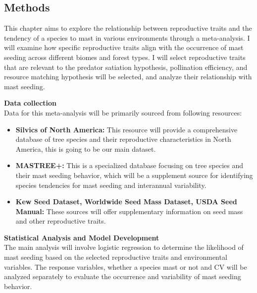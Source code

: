 \documentclass[11pt,letter]{article}
\begin{document}
\subsection{Methods}
This chapter aims to explore the relationship between reproductive traits and the tendency of a species to mast in various environments through a meta-analysis. I will examine how specific reproductive traits align with the occurrence of mast seeding across different biomes and forest types. I will select reproductive traits that are relevant to the predator satiation hypothesis, pollination efficiency, and resource matching hypothesis will be selected, and analyze their relationship with mast seeding.\par
\textbf{Data collection}\\
Data for this meta-analysis will be primarily sourced from following resources:
	\begin{itemize}
	\item \textbf{Silvics of North America:} This resource will provide a comprehensive database of tree species and their reproductive characteristics in North America, this is going to be our main dataset.
	\item \textbf{MASTREE+:} This is a specialized database focusing on tree species and their mast seeding behavior, which will be a supplement source for identifying species tendencies for mast seeding and interannual variability.
	\item \textbf{Kew Seed Dataset, Worldwide Seed Mass Dataset, USDA Seed Manual:} These sources will offer supplementary information on seed mass and other reproductive traits.
	\end{itemize}
\textbf{Statistical Analysis and Model Development}\\
The main analysis will involve logistic regression to determine the likelihood of mast seeding based on the selected reproductive traits and environmental variables. The response variables, whether a species mast or not and CV will be analyzed separately to evaluate the occurrence and variability of mast seeding behavior.
\end{document}
